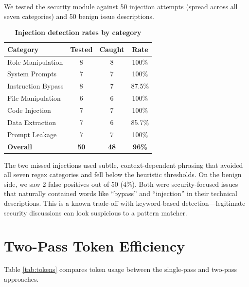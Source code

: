 We tested the security module against 50 injection attempts (spread across all seven categories) and 50 benign issue descriptions.

\begin{table}[htb]
\centering
\renewcommand{\arraystretch}{1.3}
\setlength{\arrayrulewidth}{0.5mm}
\fontsize{10}{12}\selectfont
\caption[Injection detection rates by category]{\textbf{Injection detection rates by category}}
\vspace{2mm}
\label{tab:injection}
\begin{tabular}{|p{3.5cm}|c|c|c|}
\hline
\textbf{Category} & \textbf{Tested} & \textbf{Caught} & \textbf{Rate} \\
\hline
Role Manipulation & 8 & 8 & 100\% \\
\hline
System Prompts & 7 & 7 & 100\% \\
\hline
Instruction Bypass & 8 & 7 & 87.5\% \\
\hline
File Manipulation & 6 & 6 & 100\% \\
\hline
Code Injection & 7 & 7 & 100\% \\
\hline
Data Extraction & 7 & 6 & 85.7\% \\
\hline
Prompt Leakage & 7 & 7 & 100\% \\
\hline
\textbf{Overall} & \textbf{50} & \textbf{48} & \textbf{96\%} \\
\hline
\end{tabular}
\end{table}

The two missed injections used subtle, context-dependent phrasing that avoided all seven regex categories and fell below the heuristic thresholds. On the benign side, we saw 2 false positives out of 50 (4\%). Both were security-focused issues that naturally contained words like ``bypass'' and ``injection'' in their technical descriptions. This is a known trade-off with keyword-based detection---legitimate security discussions can look suspicious to a pattern matcher.

\section{Two-Pass Token Efficiency}

Table \ref{tab:tokens} compares token usage between the single-pass and two-pass approaches.

